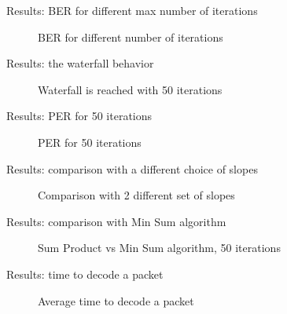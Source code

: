 \documentclass[pdf]
          {beamer}
\newlength\fheight
\newlength\fwidth
\begin{document}
\begin{frame}{Results: BER for different max number of iterations}
	\begin{figure}[t]
		\centering
		\setlength{}
		\setlength{}
		
		\caption{\small{BER for different number of iterations}}
	\end{figure}
\end{frame}

\begin{frame}{Results: the waterfall behavior}
	\begin{figure}[t]
		\centering
		\setlength{}
		\setlength{}
		
		\caption{\small{Waterfall is reached with 50 iterations}}
	\end{figure}
\end{frame}

\begin{frame}{Results: PER for 50 iterations}
	\begin{figure}[t]
		\centering
		\setlength{}
		\setlength{}
		
		\caption{\small{PER for 50 iterations}}
	\end{figure}
\end{frame}

\begin{frame}{Results: comparison with a different choice of slopes}
	\begin{figure}[t]
		\centering
		\setlength{}
		\setlength{}
		
		\caption{\small{Comparison with 2 different set of slopes}}
	\end{figure}
\end{frame}

\begin{frame}{Results: comparison with Min Sum algorithm}
	\begin{figure}[t]
		\centering
		\setlength{}
		\setlength{}
		
		\caption{\small{Sum Product vs Min Sum algorithm, 50 iterations}}
	\end{figure}
\end{frame}

\begin{frame}{Results: time to decode a packet}
	\begin{figure}[t]
		\centering
		\setlength{}
		\setlength{}
		
		\caption{\small{Average time to decode a packet}}
	\end{figure}
\end{frame}
\end{document}
